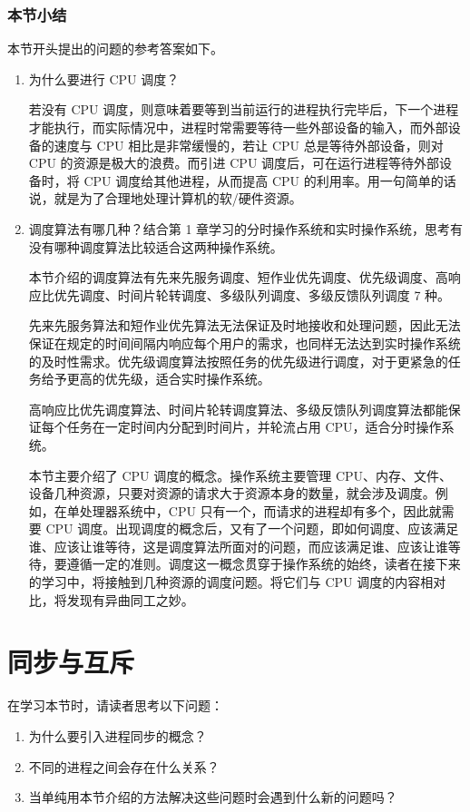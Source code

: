 \documentclass{ctexbook}
\begin{document}
	\subsubsection{本节小结}
	
	本节开头提出的问题的参考答案如下。
	
	\begin{enumerate}
		\item 为什么要进行 CPU 调度？
		
		若没有 CPU 调度，则意味着要等到当前运行的进程执行完毕后，下一个进程才能执行，而实际情况中，进程时常需要等待一些外部设备的输入，而外部设备的速度与 CPU 相比是非常缓慢的，若让 CPU 总是等待外部设备，则对 CPU 的资源是极大的浪费。而引进 CPU 调度后，可在运行进程等待外部设备时，将 CPU 调度给其他进程，从而提高 CPU 的利用率。用一句简单的话说，就是为了合理地处理计算机的软/硬件资源。
		
		\item 调度算法有哪几种？结合第 1 章学习的分时操作系统和实时操作系统，思考有没有哪种调度算法比较适合这两种操作系统。
		
		本节介绍的调度算法有先来先服务调度、短作业优先调度、优先级调度、高响应比优先调度、时间片轮转调度、多级队列调度、多级反馈队列调度 7 种。
		
		先来先服务算法和短作业优先算法无法保证及时地接收和处理问题，因此无法保证在规定的时间间隔内响应每个用户的需求，也同样无法达到实时操作系统的及时性需求。优先级调度算法按照任务的优先级进行调度，对于更紧急的任务给予更高的优先级，适合实时操作系统。
		
		高响应比优先调度算法、时间片轮转调度算法、多级反馈队列调度算法都能保证每个任务在一定时间内分配到时间片，并轮流占用 CPU，适合分时操作系统。
		
		本节主要介绍了 CPU 调度的概念。操作系统主要管理 CPU、内存、文件、设备几种资源，只要对资源的请求大于资源本身的数量，就会涉及调度。例如，在单处理器系统中，CPU 只有一个，而请求的进程却有多个，因此就需要 CPU 调度。出现调度的概念后，又有了一个问题，即如何调度、应该满足谁、应该让谁等待，这是调度算法所面对的问题，而应该满足谁、应该让谁等待，要遵循一定的准则。调度这一概念贯穿于操作系统的始终，读者在接下来的学习中，将接触到几种资源的调度问题。将它们与 CPU 调度的内容相对比，将发现有异曲同工之妙。
	\end{enumerate}
	
	
	\section{同步与互斥}
	
	在学习本节时，请读者思考以下问题：
	\begin{enumerate}
		\item 为什么要引入进程同步的概念？
		\item 不同的进程之间会存在什么关系？
		\item 当单纯用本节介绍的方法解决这些问题时会遇到什么新的问题吗？
	\end{enumerate}
	
\end{document}
